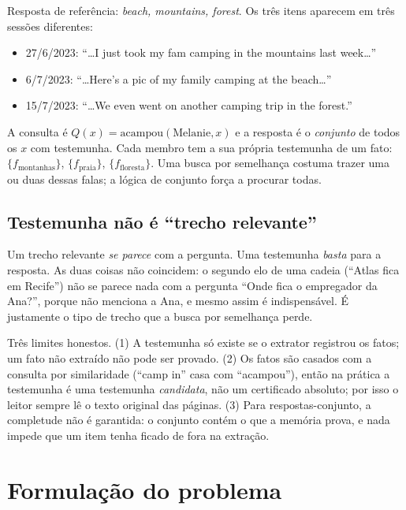 \documentclass[11pt]{article}
\begin{document}
\begin{exemplo}
Resposta de referência: \emph{beach, mountains, forest}. Os três itens
aparecem em três sessões diferentes:
\begin{itemize}[nosep]
\item 27/6/2023: ``\dots I just took my fam camping in the mountains last week\dots''
\item 6/7/2023: ``\dots Here's a pic of my family camping at the beach\dots''
\item 15/7/2023: ``\dots We even went on another camping trip in the forest.''
\end{itemize}
A consulta é $Q(x)=\mathrm{acampou}(\text{Melanie},x)$ e a resposta é o
\emph{conjunto} de todos os $x$ com testemunha. Cada membro tem a sua própria
testemunha de um fato: $\{f_{\text{montanhas}}\}$, $\{f_{\text{praia}}\}$,
$\{f_{\text{floresta}}\}$. Uma busca por semelhança costuma trazer uma ou
duas dessas falas; a lógica de conjunto força a procurar todas.
\end{exemplo}

\subsection{Testemunha não é ``trecho relevante''}

Um trecho relevante \emph{se parece} com a pergunta. Uma testemunha
\emph{basta} para a resposta. As duas coisas não coincidem: o segundo elo de
uma cadeia (``Atlas fica em Recife'') não se parece nada com a pergunta
``Onde fica o empregador da Ana?'', porque não menciona a Ana, e mesmo assim é
indispensável. É justamente o tipo de trecho que a busca por semelhança perde.

\begin{cuidado}
Três limites honestos. (1) A testemunha só existe se o extrator registrou os
fatos; um fato não extraído não pode ser provado. (2) Os fatos são casados
com a consulta por similaridade (``camp in'' casa com ``acampou''), então na
prática a testemunha é uma testemunha \emph{candidata}, não um certificado
absoluto; por isso o leitor sempre lê o texto original das páginas. (3) Para
respostas-conjunto, a completude não é garantida: o conjunto contém o que a
memória prova, e nada impede que um item tenha ficado de fora na extração.
\end{cuidado}

\section{Formulação do problema}\label{sec:problema}
\end{document}
